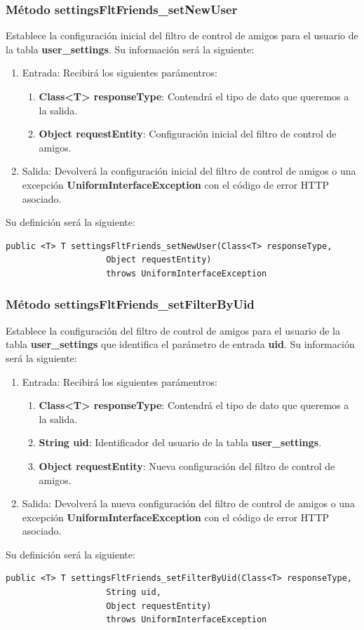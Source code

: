 \subsubsection{Método settingsFltFriends\_setNewUser}
Establece la configuración inicial del filtro de control de amigos para el usuario de la tabla \textbf{user\_settings}. Su información será la siguiente:
\begin{enumerate}
\item Entrada: Recibirá los siguientes parámentros:
\begin{enumerate}
\item \textbf{Class<T> responseType}: Contendrá el tipo de dato que queremos a la salida. 
\item \textbf{Object requestEntity}: Configuración inicial del filtro de control de amigos.
\end{enumerate}
\item Salida: Devolverá la configuración inicial del filtro de control de amigos o una excepción \textbf{UniformInterfaceException} con el código de error HTTP asociado.
\end{enumerate}
\bigskip
\par
Su definición será la siguiente:
\begin{verbatim}public <T> T settingsFltFriends_setNewUser(Class<T> responseType, 
					Object requestEntity) 
					throws UniformInterfaceException\end{verbatim}


\subsubsection{Método settingsFltFriends\_setFilterByUid}
Establece la configuración del filtro de control de amigos para el usuario de la tabla \textbf{user\_settings} que identifica el parámetro de entrada \textbf{uid}. Su información será la siguiente:
\begin{enumerate}
\item Entrada: Recibirá los siguientes parámentros:
\begin{enumerate}
\item \textbf{Class<T> responseType}: Contendrá el tipo de dato que queremos a la salida. 
\item \textbf{String uid}: Identificador del usuario de la tabla \textbf{user\_settings}.
\item \textbf{Object requestEntity}: Nueva configuración del filtro de control de amigos.
\end{enumerate}
\item Salida: Devolverá la nueva configuración del filtro de control de amigos o una excepción \textbf{UniformInterfaceException} con el código de error HTTP asociado.
\end{enumerate}
\bigskip
\par
Su definición será la siguiente:
\begin{verbatim}public <T> T settingsFltFriends_setFilterByUid(Class<T> responseType, 
					String uid, 
					Object requestEntity) 
					throws UniformInterfaceException\end{verbatim}

